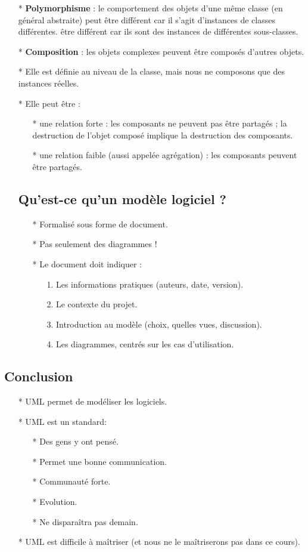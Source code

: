 \documentclass[12pt]{article}
\begin{document}
\begin{itemize}
	\item [*] \textbf{Polymorphisme} : le comportement des objets d'une même classe (en général abstraite) peut être différent car il s'agit d'instances de classes différentes.
	être différent car ils sont des instances de différentes sous-classes.
	\item [*] \textbf{Composition} : les objets complexes peuvent être composés d'autres objets.
	\item [*]  Elle est définie au niveau de la classe, mais nous ne composons que des instances réelles.
	\item [*]  Elle peut être :
	\begin{itemize}
		\item[*] une relation forte : les composants ne peuvent pas être partagés ; la destruction de l'objet composé
		implique la destruction des composants.
		\item [*] une relation faible (aussi appelée agrégation) : les composants peuvent être partagés.
	\end{itemize}
	\subsection{Qu'est-ce qu'un modèle logiciel ?}
	\begin{itemize}
		\item [*] Formalisé sous forme de document.
		\item [*] Pas seulement des diagrammes !
		\newpage
		\item [*] Le document doit indiquer :
		\begin{itemize}
			\item [1.] Les informations pratiques (auteurs, date, version).
			\item [2.] Le contexte du projet.
			\item [3.] Introduction au modèle (choix, quelles vues, discussion).
			\item [4.] Les diagrammes, centrés sur les cas d'utilisation. 
		\end{itemize}
	\end{itemize}
\end{itemize}
\subsection{Conclusion}
\begin{itemize}
	\item [*] UML permet de modéliser les logiciels.
	\item [*] UML est un standard:
	\begin{itemize}
		\item [*] Des gens y ont pensé.
		\item [*] Permet une bonne communication.
		\item  [*] Communauté forte.
		\item [*] Evolution.
		\item [*] Ne disparaîtra pas demain.
		
	\end{itemize}
\item [*]  UML est difficile à maîtriser (et nous ne le maîtriserons pas dans ce cours).
\end{itemize}
	
\end{document}
